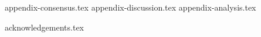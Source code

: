 \appendix
\iflong
{appendix-consensus.tex}
\fi
{appendix-discussion.tex}
{appendix-analysis.tex}

\ifanonymous\else
{acknowledgements.tex}
\fi